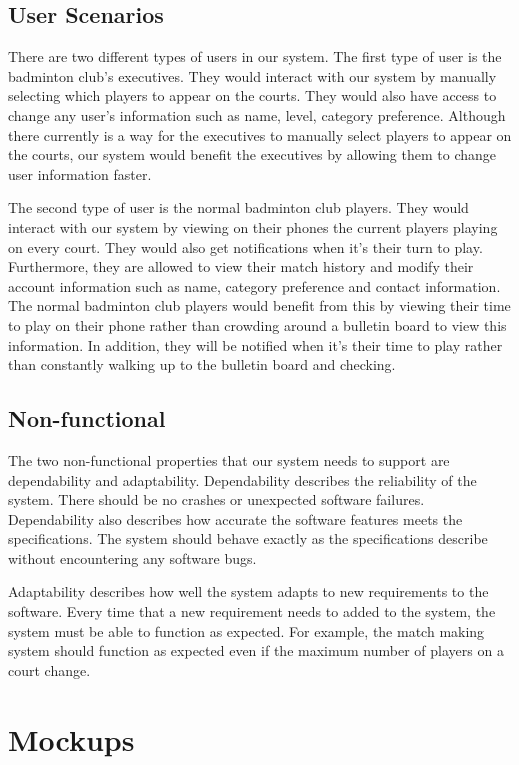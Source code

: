 \documentclass{article}
\begin{document}
\subsection{User Scenarios}
There are two different types of users in our system. The first type of user is the badminton club's executives. They would interact with our system by manually selecting which players to appear on the courts. They would also have access to change any user's information such as name, level, category preference. Although there currently is a way for the executives to manually select players to appear on the courts, our system would benefit the executives by allowing them to change user information faster.

The second type of user is the normal badminton club players. They would interact with our system by viewing on their phones the current players playing on every court. They would also get notifications when it's their turn to play. Furthermore, they are allowed to view their match history and modify their account information such as name, category preference and contact information. The normal badminton club players would benefit from this by viewing their time to play on their phone rather than crowding around a bulletin board to view this information. In addition, they will be notified when it's their time to play rather than constantly walking up to the bulletin board and checking.

\subsection{Non-functional}
The two non-functional properties that our system needs to support are dependability and adaptability. Dependability describes the reliability of the system. There should be no crashes or unexpected software failures. Dependability also describes how accurate the software features meets the specifications. The system should behave exactly as the specifications describe without encountering any software bugs.

Adaptability describes how well the system adapts to new requirements to the software. Every time that a new requirement needs to added to the system, the system must be able to function as expected. For example, the match making system should function as expected even if the maximum number of players on a court change.

\section{Mockups}
\end{document}
